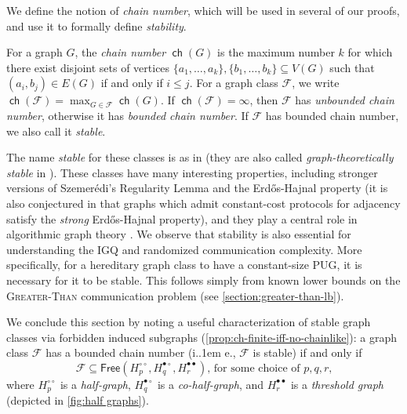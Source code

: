 \documentclass{article}
\makeatletter
\newcommand{\cF}{\ensuremath{\mathcal{F}}}
\newcommand*\ie{i.\kern.1em e.\@\xspace} %
\newcommand{\RL}{\mathsf{SK}}
\DeclareMathOperator\ch{\mathsf{ch}}
\newcommand{\free}{\mathsf{Free}}
\newcommand\IfRestateTF{%
  \ifx\label\thmt@gobble@label %
    \expandafter\@firstoftwo
  \else
    \expandafter\@secondoftwo
  \fi
}
\newcommand{\RestateRemark}{\IfRestateTF{{\normalfont\bfseries (Restated) }}{}}
\makeatother
\begin{document}
We define the notion of \emph{chain number}, which will be used in several of our proofs, and use it
to formally define \emph{stability}.

\begin{definition}
\label{def:chain number}
For a graph $G$, the \emph{chain number} $\ch(G)$ is the maximum number $k$ for which there exist
disjoint sets of vertices $\{a_1, \dotsc, a_k\}, \{b_1, \dotsc, b_k\} \subseteq V(G)$ such that
$(a_i,b_j) \in E(G)$ if and only if $i \leq j$. For a graph class $\cF$, we write $\ch(\cF) =
\max_{G \in \cF} \ch(G)$.  If $\ch(\cF) = \infty$, then $\cF$ has \emph{unbounded chain
number}, otherwise it has \emph{bounded chain number}. If $\cF$ has bounded chain number, we also
call it \emph{stable}.
\end{definition}

The name \emph{stable} for these classes is as in \cite{CS18,NMP+21} (they are also called
\emph{graph-theoretically stable} in \cite{GPT21}). These classes have many interesting properties,
including stronger versions of Szemer{\'e}di's Regularity Lemma \cite{MS14} and the Erd{\H
o}s-Hajnal property \cite{CS18} (it is also conjectured in \cite{HHH23dimfree} that graphs which
admit constant-cost protocols for adjacency satisfy the \emph{strong} Erd{\H o}s-Hajnal property),
and they play a central role in algorithmic graph theory \cite{GPT21}.  We observe that stability is
also essential for understanding the IGQ and randomized communication complexity. More specifically,
for a hereditary graph class to have a constant-size PUG, it is necessary for it to be stable. This
follows simply from known lower bounds on the \textsc{Greater-Than} communication problem (see
\cref{section:greater-than-lb}).





We conclude this section by noting a useful characterization of stable graph classes via forbidden induced subgraphs 
(\cref{prop:ch-finite-iff-no-chainlike}): a graph class $\cF$ has a bounded chain number
(\ie, $\cF$ is stable) if and only if 
$$
	\cF \subseteq \free(H^{\circ\circ}_p, H^{\bullet\circ}_q, H^{\bullet\bullet}_r) \text{, for some choice of $p,q,r$,}
$$
where $H^{\circ\circ}_p$ is a \emph{half-graph}, $H^{\bullet\circ}_q$ is a \emph{co-half-graph}, and $H^{\bullet\bullet}_r$ is a \emph{threshold graph} (depicted in \cref{fig:half graphs}).
\end{document}
